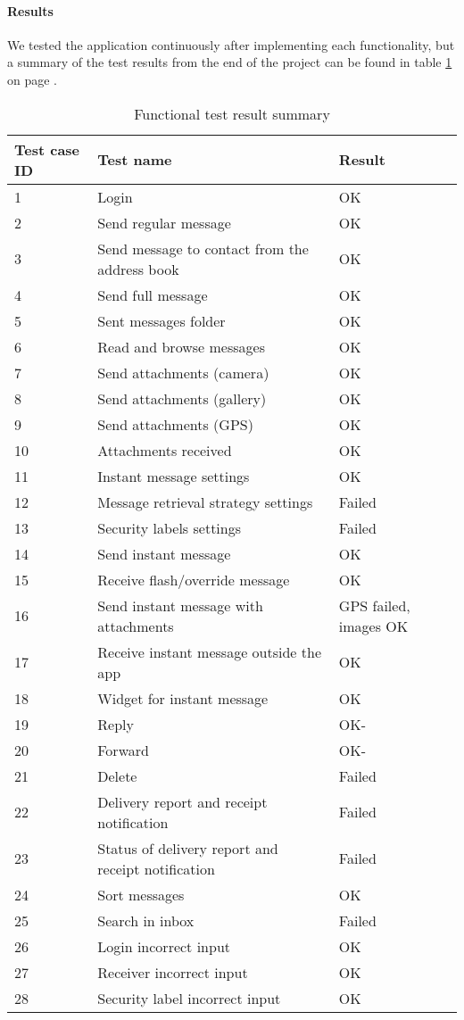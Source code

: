 			\paragraph{Results}\hfill
\newline
				We tested the application continuously after implementing each functionality, but a summary of the test results from the end of the project can be found in table \ref{tab:caseresults} on page \pageref{tab:caseresults}.
				\begin{table}[hbt]
\begin{center}
					\begin{tabular}{l|l|l}\hline
						\textbf{Test case ID} & \textbf{Test name} & \textbf{Result} \\ \hline \hline
						1&Login&OK\\
						2&Send regular message&OK\\
						3&Send message to contact from the address book&OK\\
						4&Send full message&OK\\
						5&Sent messages folder&OK\\
						6&Read and browse messages&OK\\
						7&Send attachments (camera)&OK\\
						8&Send attachments (gallery)&OK\\
						9&Send attachments (GPS)&OK\\
						10&Attachments received&OK\\
						11&Instant message settings&OK\\
						12&Message retrieval strategy settings&Failed\\
						13&Security labels settings&Failed\\
						14&Send instant message&OK\\
						15&Receive flash/override message&OK\\
						16&Send instant message with attachments&GPS failed, images OK\\
						17&Receive instant message outside the app&OK\\
						18&Widget for instant message&OK\\
						19&Reply&OK-\\
						20&Forward&OK-\\
						21&Delete&Failed\\
						22&Delivery report and receipt notification&Failed\\
						23&Status of delivery report and receipt notification&Failed\\
						24&Sort messages&OK\\
						25&Search in inbox&Failed\\	
						26&Login incorrect input&OK\\
						27&Receiver incorrect input&OK\\
						28&Security label incorrect input&OK\\ \hline
					\end{tabular}
\end{center}
\caption{Functional test result summary} \label{tab:caseresults}
\end{table}
